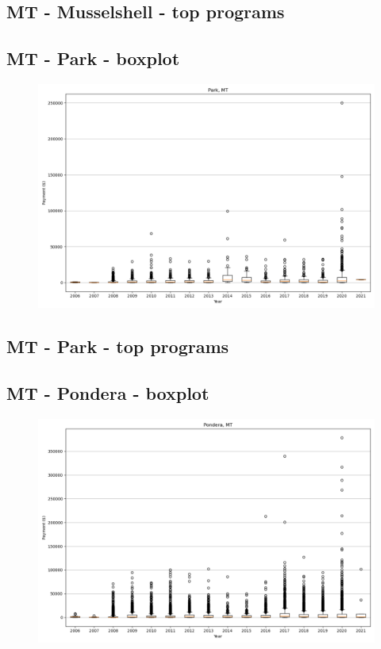 \subsection*{MT - Musselshell - top programs}

\newpage
\subsection*{MT - Park - boxplot}
\begin{figure}[h]
\centering
\includegraphics[width=7in]{../output/boxplots/counties/Park-MT_boxplot.png}
\end{figure}


\subsection*{MT - Park - top programs}

\newpage
\subsection*{MT - Pondera - boxplot}
\begin{figure}[h]
\centering
\includegraphics[width=7in]{../output/boxplots/counties/Pondera-MT_boxplot.png}
\end{figure}


